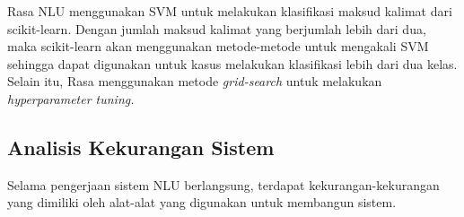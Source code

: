 Rasa NLU menggunakan SVM untuk melakukan klasifikasi maksud kalimat dari scikit-learn. Dengan jumlah maksud kalimat yang berjumlah lebih dari dua, maka scikit-learn akan menggunakan metode-metode untuk mengakali SVM sehingga dapat digunakan untuk kasus melakukan klasifikasi lebih dari dua kelas. Selain itu, Rasa menggunakan metode \textit{grid-search} untuk melakukan \textit{hyperparameter tuning.}

\subsection{Analisis Kekurangan Sistem}

Selama pengerjaan sistem NLU berlangsung, terdapat kekurangan-kekurangan yang dimiliki oleh alat-alat yang digunakan untuk membangun sistem.

%
%
%
%
